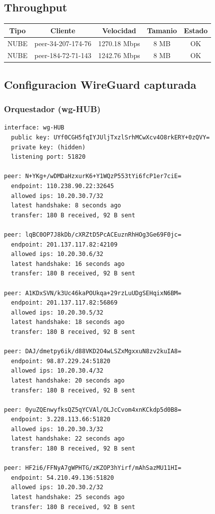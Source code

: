 \documentclass[11pt,a4paper]{article}
\begin{document}
\subsection{Throughput}
\begin{longtable}{|c|c|c|c|c|}
\hline
Tipo & Cliente & Velocidad & Tamanio & Estado \\ \hline
NUBE & peer-34-207-174-76 & 1270.18 Mbps & 8 MB & OK \\ \hline
NUBE & peer-184-72-71-143 & 1242.76 Mbps & 8 MB & OK \\ \hline
\end{longtable}

\subsection{Configuracion WireGuard capturada}
\subsubsection*{Orquestador (wg-HUB)}
\begin{lstlisting}
interface: wg-HUB
  public key: UYf0CGH5fqIYJUljTxzlSrhMCwXcv4O8rkERY+0zQVY=
  private key: (hidden)
  listening port: 51820

peer: N+YKg+/wDMDaHzxurK6+Y1WQzP553tYi6fcP1er7ciE=
  endpoint: 110.238.90.22:32645
  allowed ips: 10.20.30.7/32
  latest handshake: 8 seconds ago
  transfer: 180 B received, 92 B sent

peer: lqBC0OP7J8kDb/cXRZtD5PcACEuznRhHOg3Ge69F0jc=
  endpoint: 201.137.117.82:42109
  allowed ips: 10.20.30.6/32
  latest handshake: 16 seconds ago
  transfer: 180 B received, 92 B sent

peer: A1KDxSVN/k3Uc46kaPOUkqa+29rzLuUDgSEHqixN6BM=
  endpoint: 201.137.117.82:56869
  allowed ips: 10.20.30.5/32
  latest handshake: 18 seconds ago
  transfer: 180 B received, 92 B sent

peer: DAJ/dmetpy6ik/d88VKD2O4wLSZxMgxxuN8zv2kuIA8=
  endpoint: 98.87.229.24:51820
  allowed ips: 10.20.30.4/32
  latest handshake: 20 seconds ago
  transfer: 180 B received, 92 B sent

peer: 0yuZQEnwyfksQZ5qYCVAl/OLJcCvom4xnKCkdp5d0B8=
  endpoint: 3.228.113.66:51820
  allowed ips: 10.20.30.3/32
  latest handshake: 22 seconds ago
  transfer: 180 B received, 92 B sent

peer: HF2i6/FFNyA7gWPHTG/zKZOP3hYirf/mAhSazMU11HI=
  endpoint: 54.210.49.136:51820
  allowed ips: 10.20.30.2/32
  latest handshake: 25 seconds ago
  transfer: 180 B received, 92 B sent

\end{lstlisting}
\end{document}
